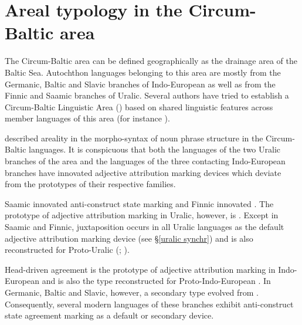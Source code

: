 
\chapter{Areal typology in the Circum-Baltic area}\label{circumbaltic}
The Circum-Baltic area can be defined geographically as the drainage area of the Baltic Sea. Autochthon languages belonging to this area are mostly from the Germanic, Baltic and Slavic branches of Indo-European as well as from the Finnic and Saamic branches of Uralic. Several authors have tried to establish a Circum-Baltic Linguistic Area () based on shared linguistic features across member languages of this area (for instance \citealt{koptjevskaja-tamm2006}).

\cite{riesler2006a} described areality in the morpho-syntax of noun phrase structure in the Circum-Baltic languages. It is conspicuous that both the languages of the two Uralic branches of the area and the languages of the three contacting Indo-European branches have innovated adjective attribution marking devices which deviate from the prototypes of their respective families.

Saamic innovated anti\hyp{}construct state marking and Finnic innovated . The prototype of adjective attribution marking in Uralic, however, is . Except in Saamic and Finnic, juxtaposition occurs in all Uralic languages as the default adjective attribution marking device (see \S\ref{uralic synchr}) and is also reconstructed for Proto\hyp{}Uralic (\citealt[66, 81]{decsy1990}; \citealt[32]{janhunen1981}).

Head\hyp{}driven agreement is the prototype of adjective attribution marking in Indo-European and is also the type reconstructed for Proto\hyp{}Indo-European \citep{decsy1991,watkins1998}. In Germanic, Baltic and Slavic, however, a secondary type evolved from . Consequently, several modern languages of these branches exhibit anti\hyp{}construct state agreement marking as a default or secondary device.

